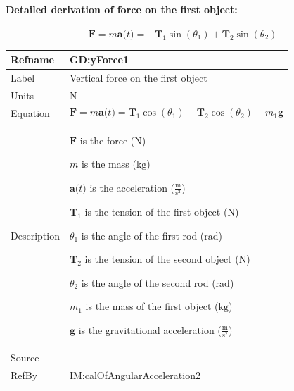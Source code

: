 \documentclass[12pt]{article}
\begin{document}
\paragraph{Detailed derivation of force on the first object:}
\label{GD:xForce1Deriv}
\begin{displaymath}
\symbf{F}=m \symbf{a}\text{(}t\text{)}=-{\symbf{T}_{1}} \sin\left({θ_{1}}\right)+{\symbf{T}_{2}} \sin\left({θ_{2}}\right)
\end{displaymath}
\vspace{\baselineskip}
\noindent
\begin{minipage}{\textwidth}
\begin{tabular}{>{\raggedright}p{}>{\raggedright\arraybackslash}p{}}
\toprule \textbf{Refname} & \textbf{GD:yForce1}
\label{GD:yForce1}
\\ \midrule
Label & Vertical force on the first object
        
\\ \midrule
Units & ${\text{N}}$
        
\\ \midrule
Equation & \begin{displaymath}
           \symbf{F}=m \symbf{a}\text{(}t\text{)}={\symbf{T}_{1}} \cos\left({θ_{1}}\right)-{\symbf{T}_{2}} \cos\left({θ_{2}}\right)-{m_{1}} \symbf{g}
           \end{displaymath}
\\ \midrule
Description & \begin{symbDescription}
              \item{$\symbf{F}$ is the force (${\text{N}}$)}
              \item{$m$ is the mass (${\text{kg}}$)}
              \item{$\symbf{a}\text{(}t\text{)}$ is the acceleration ($\frac{\text{m}}{\text{s}^{2}}$)}
              \item{${\symbf{T}_{1}}$ is the tension of the first object (${\text{N}}$)}
              \item{${θ_{1}}$ is the angle of the first rod (${\text{rad}}$)}
              \item{${\symbf{T}_{2}}$ is the tension of the second object (${\text{N}}$)}
              \item{${θ_{2}}$ is the angle of the second rod (${\text{rad}}$)}
              \item{${m_{1}}$ is the mass of the first object (${\text{kg}}$)}
              \item{$\symbf{g}$ is the gravitational acceleration ($\frac{\text{m}}{\text{s}^{2}}$)}
              \end{symbDescription}
\\ \midrule
Source & --
         
\\ \midrule
RefBy & \hyperref[IM:calOfAngularAcceleration2]{IM:calOfAngularAcceleration2}
        
\\ \bottomrule
\end{tabular}
\end{minipage}
\end{document}
